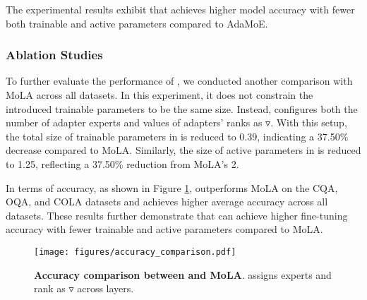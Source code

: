 The experimental results exhibit that \name achieves higher model accuracy with fewer both trainable and active parameters compared to AdaMoE.

\subsubsection{Ablation Studies}
To further evaluate the performance of \name, we conducted another comparison with MoLA across all datasets. In this experiment, it does not constrain the introduced trainable parameters to be the same size. Instead, \name configures both the number of adapter experts and values of adapters' ranks as $\triangledown$. With this setup, the total size of trainable parameters in \name is reduced to 0.39, indicating a 37.50\% decrease compared to MoLA. Similarly, the size of active parameters in \name is reduced to 1.25, reflecting a 37.50\% reduction from MoLA's 2. 

In terms of accuracy, as shown in Figure \ref{fig:comparsion_3}, \name outperforms MoLA on the CQA, OQA, and COLA datasets and achieves higher average accuracy across all datasets. These results further demonstrate that \name can achieve higher fine-tuning accuracy with fewer trainable and active parameters compared to MoLA. 

\begin{figure}[t]
    \centering
    \texttt{[image: figures/accuracy\_comparison.pdf]}
    \caption{\textbf{Accuracy comparison between \name and MoLA}. \name assigns experts and rank as $\triangledown$ across layers.}
    \label{fig:comparsion_3}
    \vspace{-5pt}
\end{figure}

\begin{table}[t]
\centering
{}
    \caption{\textbf{Performances of Mix and \name in SQA}. Mix and \name allocate experts and placeholder expert as $\triangledown$ across layers.}
    \label{tab:ablation_experiments}
    \vspace{-5pt}
\end{table}

